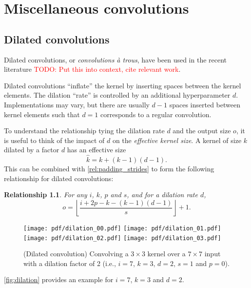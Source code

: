 \documentclass[notitlepage]{report}
\newcommand{\todo}[1]{\textcolor{red}{TODO: #1}}
\newtheorem{relationship}{Relationship}
\begin{document}
\chapter{Miscellaneous convolutions}

\section{Dilated convolutions}

Dilated convolutions, or {\em convolutions \`{a} trous}, have been used in the
recent literature \todo{Put this into context, cite relevant work}.

Dilated convolutions ``inflate'' the kernel by inserting spaces between the
kernel elements. The dilation ``rate'' is controlled by an additional
hyperparameter $d$. Implementations may vary, but there are usually $d - 1$
spaces inserted between kernel elements such that $d = 1$ corresponds to a
regular convolution.

To understand the relationship tying the dilation rate $d$ and the output size
$o$, it is useful to think of the impact of $d$ on the {\em effective kernel
size}. A kernel of size $k$ dilated by a factor $d$ has an effective size
\begin{equation*}
    \hat{k} = k + (k - 1)(d - 1).
\end{equation*}
This can be combined with \autoref{rel:padding_strides} to form the following
relationship for dilated convolutions:

\begin{relationship}\label{rel:dilation}
For any $i$, $k$, $p$ and $s$, and for a dilation rate $d$,
\begin{equation*}
    o = \left\lfloor \frac{i + 2p - k - (k - 1)(d - 1)}{s} \right\rfloor + 1.
\end{equation*}
\end{relationship}

\begin{figure}[p]
    \centering
    \texttt{[image: pdf/dilation\_00.pdf]}
    \texttt{[image: pdf/dilation\_01.pdf]}
    \texttt{[image: pdf/dilation\_02.pdf]}
    \texttt{[image: pdf/dilation\_03.pdf]}
    \caption{\label{fig:dilation} (Dilated convolution)
        Convolving a $3 \times 3$ kernel over a $7 \times 7$ input with a
        dilation factor of 2 (i.e., $i = 7$, $k = 3$, $d = 2$, $s = 1$ and
        $p = 0$).}
\end{figure}

\noindent \autoref{fig:dilation} provides an example for $i = 7$, $k = 3$ and
$d = 2$.



\end{document}
